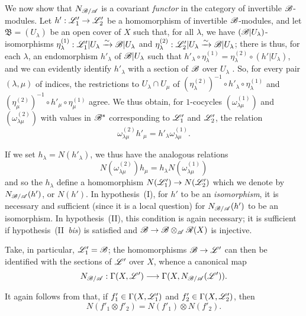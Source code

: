 \begin{env}[6.5.3]
\label{II.6.5.3}
We now show that $N_{\mathscr{B}/\mathscr{A}}$ is a covariant \emph{functor} in the category of invertible $\mathscr{B}$-modules.
Let $h':\sh{L}'_1\to\sh{L}'_2$ be a homomorphism of invertible $\mathscr{B}$-modules, and let $\mathfrak{B}=(U_\lambda)$ be an open cover of $X$ such that, for all $\lambda$, we have $(\mathscr{B}|U_\lambda)$-isomorphisms $\eta_\lambda^{(1)}:\mathscr{L}'_1|U_\lambda\xrightarrow{\sim}\mathscr{B}|U_\lambda$ and $\eta_\lambda^{(2)}:\mathscr{L}'_2|U_\lambda\xrightarrow{\sim}\mathscr{B}|U_\lambda$;
there is thus, for each $\lambda$, an endomorphism $h'_\lambda$ of $\mathscr{B}|U_\lambda$ such that $h'_\lambda\circ\eta_\lambda^{(1)}=\eta_\lambda^{(2)}\circ(h'|U_\lambda)$, and we can evidently identify $h'_\lambda$ with a section of $\mathscr{B}$ over $U_\lambda$ .
So, for every pair $(\lambda,\mu)$ of indices, the restrictions to $U_\lambda\cap U_\mu$ of $(\eta_\lambda^{(2)})^{-1}\circ h'_\lambda\circ\eta_\lambda^{(1)}$ and $(\eta_\mu^{(2)})^{-1}\circ h'_\mu\circ\eta_\mu^{(1)}$ agree.
We thus obtain, for $1$-cocycles $(\omega_{\lambda\mu}^{(1)})$ and $(\omega_{\lambda\mu}^{(2)})$ with values in $\mathscr{B}^*$ corresponding to $\mathscr{L}'_1$ and $\mathscr{L}'_2$, the relation
\[
  \omega_{\lambda\mu}^{(2)}h'_\mu = h'_\lambda\omega_{\lambda\mu}^{(1)}.
\]

If we set $h_\lambda=N(h'_\lambda)$, we thus have the analogous relations
\[
  N(\omega_{\lambda\mu}^{(2)})h_\mu = h_\lambda N(\omega_{\lambda\mu}^{(1)})
\]
and so the $h_\lambda$ define a homomorphism $N(\sh{L}'_1)\to N(\sh{L}'_2)$ which we denote by $N_{\mathscr{B}/\mathscr{A}}(h')$, or $N(h')$.
In hypothesis~(I), for $h'$ to be an \emph{isomorphism}, it is necessary and sufficient (since it is a local question) for $N_{\mathscr{B}/\mathscr{A}}(h')$ to be an isomorphism.
In hypothesis~(II), this condition is again necessary;
it is sufficient if hypothesis~(II~\emph{bis}) is satisfied and $\sh{B}\to\sh{B}\otimes_{\sh{A}}\sh{R}(X)$ is injective.

Take, in particular, $\mathscr{L}'_1=\mathscr{B}$;
the homomorphisms $\sh{B}\to\sh{L}'$ can then be identified  with the sections of $\mathscr{L}'$ over $X$, whence a canonical map
\[
  N_{\sh{B}/\sh{A}} : \Gamma(X,\sh{L}')\to\Gamma(X,N_{\sh{B}/\sh{A}}(\sh{L}')).
\]

It again follows from  that, if $f'_1\in\Gamma(X,\mathscr{L}'_1)$ and $f'_2\in\Gamma(X,\mathscr{L}'_2)$, then
\[
\label{II.6.5.3.1}
  N(f'_1\otimes f'_2) = N(f'_1)\otimes N(f'_2).
\tag{6.5.3.1}
\]


\end{env}
